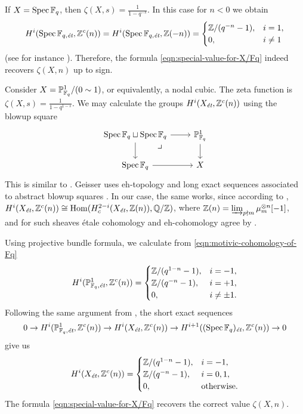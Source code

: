 \documentclass{article}
\numberwithin{equation}{section}
\begin{document}
\begin{example}
  \label{example:C(X,n)-for-Spec-Fq}
  If $X = \Spec \FF_q$, then $\zeta (X,s) = \frac{1}{1 - q^{-s}}$. In this case
  for $n < 0$ we obtain
  \begin{equation}
    \label{eqn:motivic-cohomology-of-Fq}
    H^i (\Spec \FF_{q,\et}, \ZZ^c (n)) = H^i (\Spec \FF_{q,\et}, \ZZ (-n)) =
    \begin{cases}
      \ZZ/(q^{-n} - 1), & i = 1, \\
      0, & i \ne 1
    \end{cases}
  \end{equation}
  (see for instance \cite[Example~4.2]{Geisser-2017}).
  Therefore, the formula \eqref{eqn:special-value-for-X/Fq} indeed recovers
  $\zeta (X,n)$ up to sign.
\end{example}

\begin{example}
  Consider $X = \PP^1_{\FF_q}/(0\sim 1)$, or equivalently, a nodal cubic.
  The zeta function is $\zeta (X,s) = \frac{1}{1 - q^{1-s}}$.  We may calculate
  the groups $H^i (X_\et, \ZZ^c (n))$ using the blowup square
  \[ \begin{tikzcd}
      \Spec \FF_q \sqcup \Spec \FF_q \ar{r}\ar{d}\tikzpb & \PP^1_{\FF_q} \ar{d} \\
      \Spec \FF_q \ar{r} & X
    \end{tikzcd} \]
  This is similar to \cite[\S 8, Example~2]{Geisser-2006}. Geisser uses
  eh-topology and long exact sequences associated to abstract blowup squares
  \cite[Proposition~3.2]{Geisser-2006}. In our case, the same works, since
  according to \cite[Theorem~I]{Beshenov-Weil-etale-1},
  $H^i (X_\et, \ZZ^c (n)) \cong \Hom (H^{2-i}_c (X_\et, \ZZ (n)),\QQ/\ZZ)$,
  where $\ZZ (n) = \varinjlim_{p\nmid m} \mu_m^{\otimes n} [-1]$, and
  for such sheaves étale cohomology and eh-cohomology agree by
  \cite[Theorem~3.6]{Geisser-2006}.

  Using projective bundle formula, we calculate from
  \eqref{eqn:motivic-cohomology-of-Fq}
  \[ H^i (\PP^1_{\FF_q,\et}, \ZZ^c (n)) = \begin{cases}
      \ZZ/(q^{1-n} - 1), & i = -1, \\
      \ZZ/(q^{-n} - 1), & i = +1, \\
      0, & i \ne \pm 1.
    \end{cases} \]
  Following the same argument from \cite[\S 8, Example~2]{Geisser-2006},
  the short exact sequences
  \[ 0 \to H^i (\PP^1_{\FF_q,\et}, \ZZ^c (n)) \to
    H^i (X_\et, \ZZ^c (n)) \to
    H^{i+1} ((\Spec \FF_q)_\et, \ZZ^c (n)) \to 0 \]
  give us
  \[ H^i (X_\et, \ZZ^c (n)) = \begin{cases}
      \ZZ/(q^{1-n} - 1), & i = -1, \\
      \ZZ/(q^{-n} - 1), & i = 0,1, \\
      0, & \text{otherwise}.
    \end{cases} \]
  The formula \eqref{eqn:special-value-for-X/Fq} recovers the correct value
  $\zeta (X,n)$.
\end{example}
\end{document}
